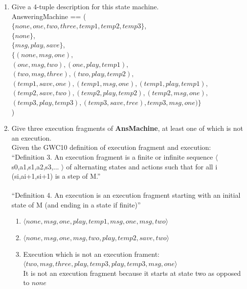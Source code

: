 \documentclass{article}
\begin{document}
\begin{enumerate}
\begin{enumerate}
 \item Give a 4-tuple description for this state machine. \\
   AnsweringMachine == ( \\
   $\{none,one,two,three,temp1,temp2,temp3 \}$, \\
   $\{none \}$, \\
   $\{msg, play, save \}$, \\
   $\{(none, msg, one),$ \\
   $ (one, msg, two), (one, play, temp1),$ \\
   $ (two, msg, three),(two, play, temp2),$ \\
   $ (temp1, save, one), (temp1, msg, one), (temp1, play, temp1), $ \\
   $ (temp2, save, two), (temp2, play, temp2), (temp2, msg, one),$ \\
   $ (temp3, play, temp3), (temp3, save, tree), temp3, msg, one) \}$ \\
   ) \\
 \item Give three execution fragments of {\bf AnsMachine}, at least one of which is not an
   execution. \\
   Given the GWC10 definition of execution fragment and execution: \\
   ``Definition 3. An execution fragment is a finite or infinite sequence $\langle$ s0,a1,s1,a2,s3,... $\rangle$ of alternating states and actions such that for all i (si,ai+1,si+1) is a step of M.''\\
   \\
   ``Definition 4. An execution is an execution fragment starting with an initial state of M (and ending in a state if finite)'' \\
   \begin{enumerate}
   \item $\langle none, msg, one, play, temp1, msg, one, msg, two \rangle$
   \item $\langle none, msg, one, msg, two, play, temp2, save, two\rangle$
   \item Execution which is not an execution frament: \\ $\langle two, msg, three, play, temp3, play, temp3, msg, one \rangle$ \\
     It is not an execution fragment because it starts at state two as opposed to $none$ \\
   \end{enumerate}
 

\end{enumerate}
\end{enumerate}
\end{document}
